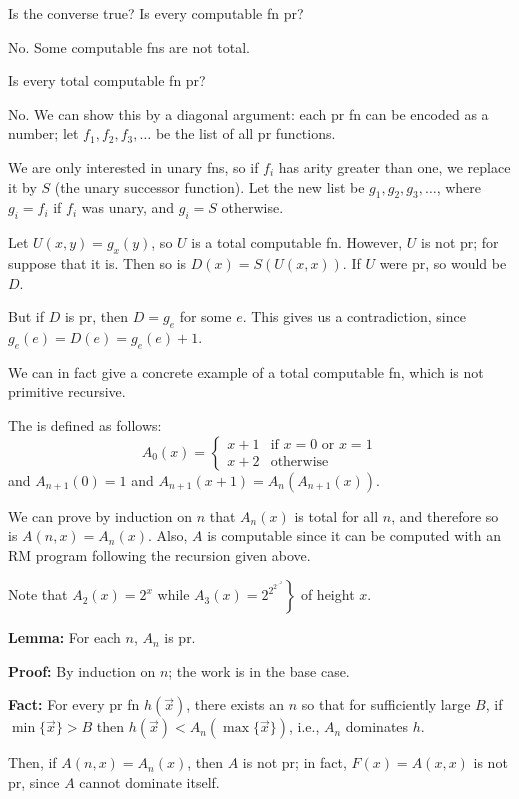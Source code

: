 \begin{frame}
Is the converse true?  Is every computable fn pr?

No.  Some computable fns are not total.

Is every total computable fn pr?

No.  We can show this by a diagonal argument: each pr fn can be
encoded as a number; let $f_1,f_2,f_3,\ldots$ be the list of all pr
functions.

We are only interested in unary fns, so if $f_i$ has arity greater
than one, we replace it by $S$ (the unary successor function).  Let
the new list be $g_1,g_2,g_3,\ldots$, where $g_i=f_i$ if $f_i$ was
unary, and $g_i=S$ otherwise.

Let $U(x,y)=g_x(y)$, so $U$ is a total computable fn.  However, $U$ is
not pr; for suppose that it is.  Then so is $D(x)=S(U(x,x))$.  If $U$
were pr, so would be $D$.  

But if $D$ is pr, then $D=g_e$ for some $e$.  This gives us a
contradiction, since $g_e(e)=D(e)=g_e(e)+1$.
\end{frame}

\begin{frame}
We can in fact give a concrete example of a total computable fn, which
is not primitive recursive. 

The  is defined as follows:
$$
A_0(x)=\begin{cases}
x+1 & \text{if $x=0$ or $x=1$} \\
x+2 & \text{otherwise}
\end{cases}
$$
and $A_{n+1}(0)=1$ and $A_{n+1}(x+1)=A_n(A_{n+1}(x))$.

We can prove by induction on $n$ that $A_n(x)$ is total for all $n$,
and therefore so is $A(n,x)=A_n(x)$.  Also, $A$ is computable since it
can be computed with an RM program following the recursion given
above.

Note that $A_2(x)=2^x$ while
$A_3(x)=\left. 2^{2^{2^{\iddots^2}}}\right\}$ of height
$x$.
\end{frame}

\begin{frame}

{\bf Lemma:} For each $n$, $A_n$ is pr.

{\bf Proof:} By induction on $n$; the work is in the base case.

{\bf Fact:}  For every pr fn $h(\vec{x})$, there exists an $n$ so that
for sufficiently large $B$, if $\min\{\vec{x}\}>B$ then
$h(\vec{x})<A_n(\max\{\vec{x}\})$, i.e., $A_n$ dominates $h$.  

Then, if $A(n,x)=A_n(x)$, then $A$ is not pr; in fact, $F(x)=A(x,x)$
is not pr, since $A$ cannot dominate itself.


\end{frame}

